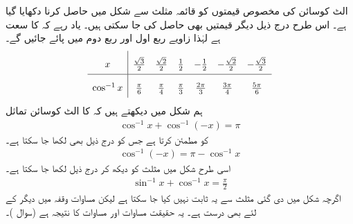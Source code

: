 الٹ کوسائن کی مخصوص قیمتوں کو قائمہ مثلث سے شکل  میں حاصل کرنا دکھایا گیا ہے۔ اس طرح درج ذیل دیگر قیمتیں بھی حاصل کی جا سکتی ہیں۔ یاد رہے کہ  کا سعت  ہے  لہٰذا زاویے ربع اول اور ربع دوم میں پائے جائیں گے۔
\begin{align*}
\renewcommand{\arraystretch}{2} 
\begin{array}{c|cccccc}
x&\tfrac{\sqrt{3}}{2}&\tfrac{\sqrt{2}}{2}&\tfrac{1}{2}&-\tfrac{1}{2}&-\tfrac{\sqrt{2}}{2}&-\tfrac{\sqrt{3}}{2}\\
\hline
\cos^{-1}x&\tfrac{\pi}{6}&\tfrac{\pi}{4}&\tfrac{\pi}{3}&\tfrac{2\pi}{3}&\tfrac{3\pi}{4}&\tfrac{5\pi}{6}
\end{array}
\end{align*}
ہم شکل  میں دیکھتے ہیں کہ  کا الٹ کوسائن تماثل
\begin{align}\label{مساوات_ماورائی_تماثل_الف}
\cos^{-1}x+\cos^{-1}(-x)=\pi
\end{align}
کو مطمئن کرتا ہے جس کو درج ذیل بھی لکھا جا سکتا ہے۔
\begin{align}\label{مساوات_ماورائی_تماثل_ب}
\cos^{-1}(-x)=\pi-\cos^{-1}x
\end{align}
اسی طرح شکل  میں مثلث کو دیکھ کر درج ذیل لکھا جا سکتا ہے۔
\begin{align}\label{مساوات_ماورائی_تماثل_ج}
\sin^{-1}x+\cos^{-1}x=\frac{\pi}{2}
\end{align}
اگرچہ شکل  میں دی گئی مثلث سے یہ ثابت نہیں کیا جا سکتا ہے لیکن مساوات  وقفہ  میں دیگر  کے لئے بھی درست ہے۔ یہ حقیقت مساوات  اور مساوات  کا نتیجہ ہے (سوال )۔
